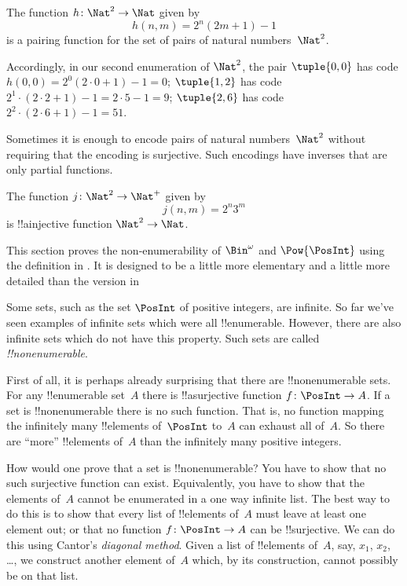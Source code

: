 \begin{ex}
The function $h\colon \Nat^2 \to \Nat$ given by
\[
h(n,m) = 2^n (2m+1) - 1
\]
is a pairing function for the set of pairs of natural numbers~$\Nat^2$.
\end{ex}

\begin{explain}
Accordingly, in our second enumeration of $\Nat^2$, the pair
$\tuple{0,0}$ has code $h(0,0) = 2^0(2\cdot 0+1) - 1 = 0$;
$\tuple{1,2}$ has code $2^{1} \cdot (2 \cdot 2 + 1) - 1 = 2
\cdot 5 - 1 = 9$; $\tuple{2,6}$ has code $2^{2} \cdot (2
\cdot 6 + 1) - 1 = 51$.
\end{explain}

Sometimes it is enough to encode pairs of natural numbers~$\Nat^2$
without requiring that the encoding is surjective. Such encodings have
inverses that are only partial functions. 

\begin{ex}
The function $j\colon \Nat^2 \to \Nat^+$ given by
\[
j(n,m) = 2^n3^m
\]
is !!a{injective} function $\Nat^2 \to \Nat$.
\end{ex}







\begin{editorial}
  This section proves the non-enumerability of $\Bin^\omega$ and
  $\Pow{\PosInt}$ using the definition in . It is
  designed to be a little more elementary and a little more detailed
  than the version in 
\end{editorial}

Some sets, such as the set $\PosInt$ of positive integers, are
infinite. So far we've seen examples of infinite sets which were all
!!{enumerable}. However, there are also infinite sets which do not
have this property. Such sets are called \emph{!!{nonenumerable}}.

First of all, it is perhaps already surprising that there are
!!{nonenumerable} sets.  For any !!{enumerable} set~$A$ there is
!!a{surjective} function $f \colon \PosInt \to A$.  If a set is
!!{nonenumerable} there is no such function.  That is, no function
mapping the infinitely many !!{element}s of~$\PosInt$ to~$A$ can
exhaust all of~$A$.  So there are ``more'' !!{element}s of~$A$ than
the infinitely many positive integers.

How would one prove that a set is !!{nonenumerable}? You have to show
that no such surjective function can exist. Equivalently, you have to
show that the elements of~$A$ cannot be enumerated in a one way
infinite list.  The best way to do this is to show that every list of
!!{element}s of~$A$ must leave at least one element out; or that no
function $f\colon \PosInt \to A$ can be !!{surjective}.  We can do this
using Cantor's \emph{diagonal method}.  Given a list of !!{element}s
of~$A$, say, $x_1$, $x_2$, \dots, we construct another element of~$A$
which, by its construction, cannot possibly be on that list.

